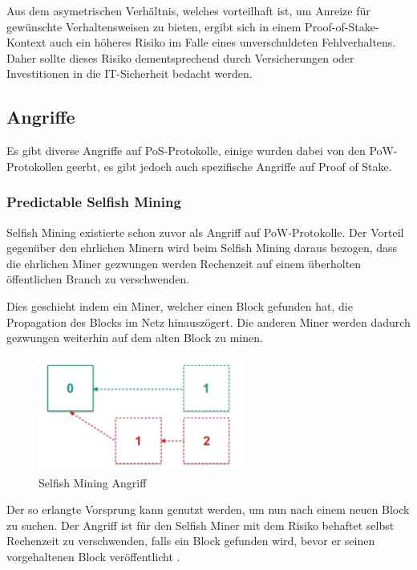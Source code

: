 Aus dem asymetrischen Verhältnis, welches vorteilhaft ist, um Anreize für gewünschte Verhaltensweisen zu bieten, ergibt sich in einem Proof-of-Stake-Kontext auch ein höheres Risiko im Falle eines unverschuldeten Fehlverhaltens.
Daher sollte dieses Risiko dementsprechend durch Versicherungen oder Investitionen in die IT-Sicherheit bedacht werden.



\subsection{Angriffe}

Es gibt diverse Angriffe auf PoS-Protokolle, einige wurden dabei von den PoW-Protokollen geerbt, es gibt jedoch auch spezifische Angriffe auf Proof of Stake.

\subsubsection{Predictable Selfish Mining}
\label{subsec:selfishmining}

Selfish Mining existierte schon zuvor als Angriff auf PoW-Protokolle.
Der Vorteil gegenüber den ehrlichen Minern wird beim Selfish Mining daraus bezogen, dass die ehrlichen Miner gezwungen werden Rechenzeit auf einem überholten öffentlichen Branch zu verschwenden.

Dies geschieht indem ein Miner, welcher einen Block gefunden hat, die Propagation des Blocks im Netz hinauszögert. Die anderen Miner werden dadurch gezwungen weiterhin auf dem alten Block zu minen. 

\begin{figure}[htb] 
	\centerline{\includegraphics*[width=0.6\textwidth]{img/selfish_mining}}
\caption{Selfish Mining Angriff}
\label{fig:selfish_mining}
\end{figure}

Der so erlangte Vorsprung kann genutzt werden, um nun nach einem neuen Block zu suchen. Der Angriff ist für den Selfish Miner mit dem Risiko behaftet selbst Rechenzeit zu verschwenden, falls ein Block gefunden wird, bevor er seinen vorgehaltenen Block veröffentlicht \cite[S. 440ff.]{btc_selfishmining} \cite[S. 6ff.]{subversive_strategies}.

